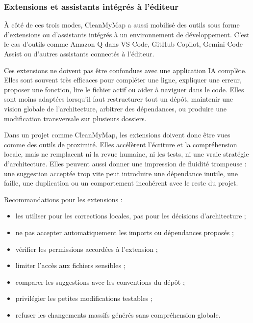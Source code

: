 \documentclass[
  10pt,
  a4paper,
  DIV=11,
  numbers=noendperiod,
  oneside]{scrreprt}
\providecommand{\tightlist}{%
  \setlength{\itemsep}{0pt}\setlength{\parskip}{0pt}}
\begin{document}
\subsubsection{Extensions et assistants intégrés à
l'éditeur}\label{extensions-et-assistants-intuxe9gruxe9s-uxe0-luxe9diteur}

À côté de ces trois modes, CleanMyMap a aussi mobilisé des outils sous
forme d'extensions ou d'assistants intégrés à un environnement de
développement. C'est le cas d'outils comme Amazon Q dans VS Code, GitHub
Copilot, Gemini Code Assist ou d'autres assistants connectés à
l'éditeur.

Ces extensions ne doivent pas être confondues avec une application IA
complète. Elles sont souvent très efficaces pour compléter une ligne,
expliquer une erreur, proposer une fonction, lire le fichier actif ou
aider à naviguer dans le code. Elles sont moins adaptées lorsqu'il faut
restructurer tout un dépôt, maintenir une vision globale de
l'architecture, arbitrer des dépendances, ou produire une modification
transversale sur plusieurs dossiers.

Dans un projet comme CleanMyMap, les extensions doivent donc être vues
comme des outils de proximité. Elles accélèrent l'écriture et la
compréhension locale, mais ne remplacent ni la revue humaine, ni les
tests, ni une vraie stratégie d'architecture. Elles peuvent aussi donner
une impression de fluidité trompeuse : une suggestion acceptée trop vite
peut introduire une dépendance inutile, une faille, une duplication ou
un comportement incohérent avec le reste du projet.

Recommandations pour les extensions :

\begin{itemize}
\tightlist
\item
  les utiliser pour les corrections locales, pas pour les décisions
  d'architecture ;
\item
  ne pas accepter automatiquement les imports ou dépendances proposés ;
\item
  vérifier les permissions accordées à l'extension ;
\item
  limiter l'accès aux fichiers sensibles ;
\item
  comparer les suggestions avec les conventions du dépôt ;
\item
  privilégier les petites modifications testables ;
\item
  refuser les changements massifs générés sans compréhension globale.
\end{itemize}
\end{document}
